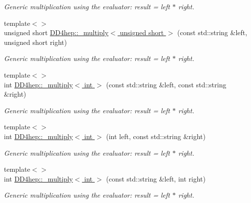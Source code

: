 \begin{DoxyCompactItemize}
\begin{DoxyCompactList}\small\item\em Generic multiplication using the evaluator: result = left $\ast$ right. \item\end{DoxyCompactList}\item 
{\footnotesize template$<$$>$ }\\unsigned short \hyperlink{group___d_d4_h_e_p___g_e_o_m_e_t_r_y_gabd00a1e32b7fc41a33e0372b7657475c}{DD4hep::\_\-multiply$<$ unsigned short $>$} (const std::string \&left, unsigned short right)
\begin{DoxyCompactList}\small\item\em Generic multiplication using the evaluator: result = left $\ast$ right. \item\end{DoxyCompactList}\item 
{\footnotesize template$<$$>$ }\\int \hyperlink{group___d_d4_h_e_p___g_e_o_m_e_t_r_y_gaa8e3a445b4796f599909c845e7a3e68e}{DD4hep::\_\-multiply$<$ int $>$} (const std::string \&left, const std::string \&right)
\begin{DoxyCompactList}\small\item\em Generic multiplication using the evaluator: result = left $\ast$ right. \item\end{DoxyCompactList}\item 
{\footnotesize template$<$$>$ }\\int \hyperlink{group___d_d4_h_e_p___g_e_o_m_e_t_r_y_ga673bbee716fc3377cc75b9a68bb84d86}{DD4hep::\_\-multiply$<$ int $>$} (int left, const std::string \&right)
\begin{DoxyCompactList}\small\item\em Generic multiplication using the evaluator: result = left $\ast$ right. \item\end{DoxyCompactList}\item 
{\footnotesize template$<$$>$ }\\int \hyperlink{group___d_d4_h_e_p___g_e_o_m_e_t_r_y_ga172a8b06e031748282218c39fd4aeeb9}{DD4hep::\_\-multiply$<$ int $>$} (const std::string \&left, int right)
\begin{DoxyCompactList}\small\item\em Generic multiplication using the evaluator: result = left $\ast$ right. \item\end{DoxyCompactList}\item 

\end{DoxyCompactItemize}
